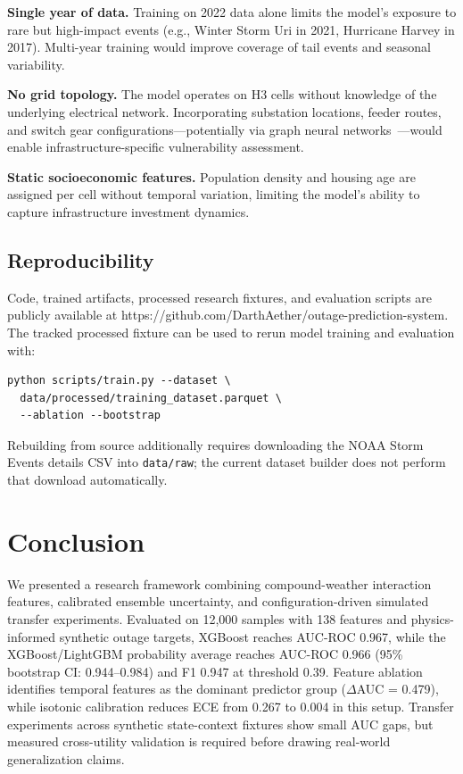 \documentclass[conference]{IEEEtran}
\begin{document}
\textbf{Single year of data.} Training on 2022 data alone limits the model's exposure to rare but high-impact events (e.g., Winter Storm Uri in 2021, Hurricane Harvey in 2017). Multi-year training would improve coverage of tail events and seasonal variability.

\textbf{No grid topology.} The model operates on H3 cells without knowledge of the underlying electrical network. Incorporating substation locations, feeder routes, and switch gear configurations---potentially via graph neural networks~\cite{owerko2018gnn}---would enable infrastructure-specific vulnerability assessment.

\textbf{Static socioeconomic features.} Population density and housing age are assigned per cell without temporal variation, limiting the model's ability to capture infrastructure investment dynamics.

\subsection{Reproducibility}

Code, trained artifacts, processed research fixtures, and evaluation scripts are publicly available at https://github.com/DarthAether/outage-prediction-system. The tracked processed fixture can be used to rerun model training and evaluation with:
\begin{verbatim}
python scripts/train.py --dataset \
  data/processed/training_dataset.parquet \
  --ablation --bootstrap
\end{verbatim}
Rebuilding from source additionally requires downloading the NOAA Storm Events details CSV into \texttt{data/raw}; the current dataset builder does not perform that download automatically.

\section{Conclusion}\label{sec:conclusion}

We presented a research framework combining compound-weather interaction features, calibrated ensemble uncertainty, and configuration-driven simulated transfer experiments. Evaluated on 12{,}000 samples with 138 features and physics-informed synthetic outage targets, XGBoost reaches AUC-ROC 0.967, while the XGBoost/LightGBM probability average reaches AUC-ROC 0.966 (95\% bootstrap CI: 0.944--0.984) and F1 0.947 at threshold 0.39. Feature ablation identifies temporal features as the dominant predictor group ($\Delta$AUC = 0.479), while isotonic calibration reduces ECE from 0.267 to 0.004 in this setup. Transfer experiments across synthetic state-context fixtures show small AUC gaps, but measured cross-utility validation is required before drawing real-world generalization claims.
\end{document}
